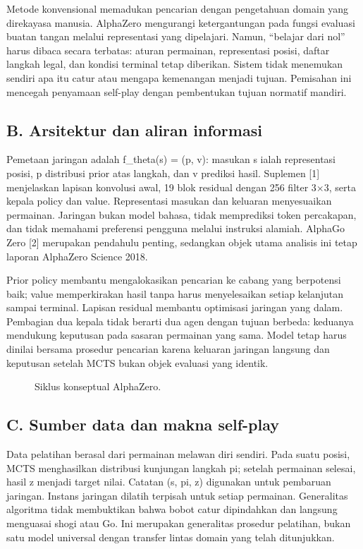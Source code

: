 \documentclass[conference,a4paper]{IEEEtran}
\begin{document}
Metode konvensional memadukan pencarian dengan pengetahuan domain yang direkayasa manusia. AlphaZero mengurangi ketergantungan pada fungsi evaluasi buatan tangan melalui representasi yang dipelajari. Namun, ``belajar dari nol'' harus dibaca secara terbatas: aturan permainan, representasi posisi, daftar langkah legal, dan kondisi terminal tetap diberikan. Sistem tidak menemukan sendiri apa itu catur atau mengapa kemenangan menjadi tujuan. Pemisahan ini mencegah penyamaan self-play dengan pembentukan tujuan normatif mandiri.

\subsection*{B. Arsitektur dan aliran informasi}
Pemetaan jaringan adalah f\_theta(s) = (p, v): masukan s ialah representasi posisi, p distribusi prior atas langkah, dan v prediksi hasil. Suplemen [1] menjelaskan lapisan konvolusi awal, 19 blok residual dengan 256 filter 3$\times$3, serta kepala policy dan value. Representasi masukan dan keluaran menyesuaikan permainan. Jaringan bukan model bahasa, tidak memprediksi token percakapan, dan tidak memahami preferensi pengguna melalui instruksi alamiah. AlphaGo Zero [2] merupakan pendahulu penting, sedangkan objek utama analisis ini tetap laporan AlphaZero Science 2018.

Prior policy membantu mengalokasikan pencarian ke cabang yang berpotensi baik; value memperkirakan hasil tanpa harus menyelesaikan setiap kelanjutan sampai terminal. Lapisan residual membantu optimisasi jaringan yang dalam. Pembagian dua kepala tidak berarti dua agen dengan tujuan berbeda: keduanya mendukung keputusan pada sasaran permainan yang sama. Model tetap harus dinilai bersama prosedur pencarian karena keluaran jaringan langsung dan keputusan setelah MCTS bukan objek evaluasi yang identik.

\begin{figure}[ht]\centering{}\caption{Siklus konseptual AlphaZero.}\end{figure}
\subsection*{C. Sumber data dan makna self-play}
Data pelatihan berasal dari permainan melawan diri sendiri. Pada suatu posisi, MCTS menghasilkan distribusi kunjungan langkah pi; setelah permainan selesai, hasil z menjadi target nilai. Catatan (s, pi, z) digunakan untuk pembaruan jaringan. Instans jaringan dilatih terpisah untuk setiap permainan. Generalitas algoritma tidak membuktikan bahwa bobot catur dipindahkan dan langsung menguasai shogi atau Go. Ini merupakan generalitas prosedur pelatihan, bukan satu model universal dengan transfer lintas domain yang telah ditunjukkan.
\end{document}
